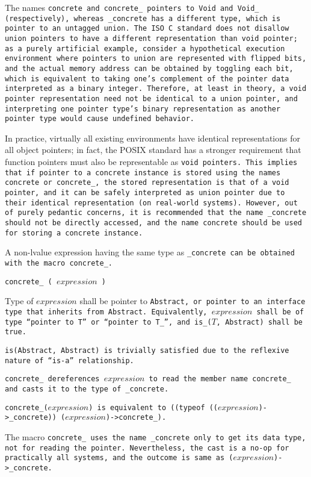 The names \tt{concrete} and \tt{concrete_} pointers to
\tt{Void} and \tt{Void_} (respectively), whereas \tt{_concrete}
has a different type, which is pointer to an untagged union.
The ISO C standard does not disallow union pointers to have a different
representation than \tt{void} pointer; as a purely artificial example,
consider a hypothetical execution environment where pointers to union
are represented with flipped bits, and the actual memory address can
be obtained by toggling each bit, which is equivalent to taking one's
complement of the pointer data interpreted as a binary integer.
Therefore, at least in theory, a \tt{void} pointer representation need not
be identical to a union pointer, and interpreting one pointer type's binary
representation as another pointer type would cause undefined behavior.

In practice, virtually all existing environments have identical representations
for all object pointers; in fact, the POSIX standard has a stronger requirement
that function pointers must also be representable as \tt{void} pointers.
This implies that if pointer to a concrete instance is stored using the
names \tt{concrete} or \tt{concrete_}, the stored representation is
that of a \tt{void} pointer, and it can be safely interpreted as union
pointer due to their identical representation (on real-world systems).
However, out of purely pedantic concerns, it is recommended that
the name \tt{_concrete} should not be directly accessed, and the
name \tt{concrete} should be used for storing a concrete instance.

A non-lvalue expression having the same type as \tt{_concrete}
can be obtained with the macro \tt{concrete_}.


\tt{concrete_ (} $expression$ \tt{)}


Type of $expression$ shall be pointer to \tt{Abstract}, or
pointer to an interface type that inherits from \tt{Abstract}.
Equivalently, $expression$ shall be of type ``pointer to $T$'' or
``pointer to $T$\_'', and \tt{is_(}$T$\tt{, Abstract)} shall be \tt{true}.

\note \tt{is(Abstract, Abstract)} is trivially satisfied
due to the reflexive nature of ``is-a'' relationship.


\tt{concrete_} dereferences $expression$ to read the member
name \tt{concrete_} and casts it to the type of \tt{_concrete}.

\tt {concrete_(}$expression$\tt{)} is equivalent to
\tt{((typeof ((}$expression$\tt{)->_concrete)) (}$expression$\tt{)->concrete_)}.

\note The macro \tt{concrete_} uses the name \tt{_concrete}
only to get its data type, not for reading the pointer.
Nevertheless, the cast is a no-op for practically all systems,
and the outcome is same as \tt{(}$expression$\tt{)->_concrete}.
